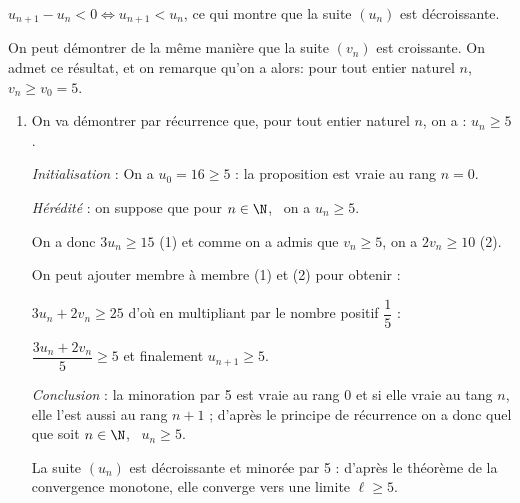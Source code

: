 \begin{enumerate}
\begin{enumerate}
$u_{n+1} - u_n < 0 \iff u_{n+1} < u_n$, ce qui montre que la suite $\left(u_n\right)$ est décroissante.
\end{enumerate}
		
On peut démontrer de la même manière que la suite $\left(v_n\right)$ est croissante. On admet ce résultat, et on remarque qu'on a alors: pour tout entier naturel $n$,\, $v_n \geqslant v_0 = 5$.
\begin{enumerate}[resume]
		\item  On va démontrer par récurrence que, pour tout entier naturel $n$, on a : $u_n \geqslant 5$. 
		
\emph{Initialisation } : On a $u_0 = 16 \geqslant 5$ : la proposition est vraie au rang $n = 0$.

\emph{Hérédité} : on suppose que pour $n \in \N$, \, on a $u_n \geqslant 5$.

On a donc $3u_n \geqslant 15$ (1) et comme on a admis que $v_n \geqslant 5$, on a $2v_n \geqslant 10$ (2).

On peut ajouter membre à membre (1) et (2) pour obtenir :

$3u_n + 2v_n \geqslant 25$ d'où en multipliant par le nombre positif $\dfrac{1}{5}$ :

$\dfrac{3u_n + 2v_n}{5} \geqslant 5$ et finalement $u_{n+1} \geqslant 5$.

\emph{Conclusion } : la minoration par 5 est vraie au rang 0 et si elle vraie au tang $n$, elle l'est aussi au rang $n + 1$ ; d'après le principe de récurrence on a donc quel que soit $n \in \N$, \, $u_n \geqslant 5$.

La suite $\left(u_n\right)$ est décroissante et minorée par 5 : d'après le théorème de la convergence monotone,  elle converge  vers une limite $\ell \geqslant 5$.
	\end{enumerate}
\end{enumerate}
	
